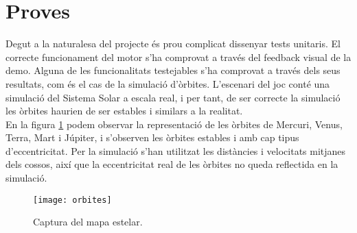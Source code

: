\section{Proves}
Degut a la naturalesa del projecte és prou complicat dissenyar tests unitaris. El correcte funcionament del motor s'ha comprovat a través del feedback visual de la demo.
Alguna de les funcionalitats testejables s'ha comprovat a través dels seus resultats, com és el cas de la simulació d'òrbites. L'escenari del joc conté una simulació del Sistema Solar a escala real, i per tant, de ser correcte la simulació les òrbites haurien de ser estables i similars a la realitat.
\\


En la figura \ref{mapaestelar} podem observar la representació de les òrbites de Mercuri, Venus, Terra, Mart i Júpiter, i s'observen les òrbites estables i amb cap tipus d'eccentricitat. Per la simulació s'han utilitzat les distàncies i velocitats mitjanes dels cossos, així que la eccentricitat real de les òrbites no queda reflectida en la simulació.
\begin{figure}[H]
  \centering
  \texttt{[image: orbites]}
  \caption{Captura del mapa estelar.}
  \label{mapaestelar}
\end{figure}


